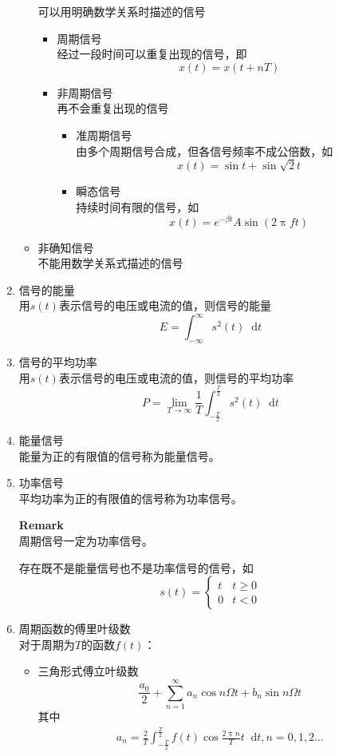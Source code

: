 \documentclass[UTF8]{ctexrep}
\newcommand{\dif}{\mathop{}\!{}\mathrm{d}}
\def\pth#1{\left( {#1}\right)}
\renewcommand{\rem}{{\bfseries Remark}}
\begin{document}
\begin{enumerate}
\begin{itemize}
可以用明确数学关系时描述的信号
\begin{itemize}
\item 周期信号\\
经过一段时间可以重复出现的信号，即
\[x(t)=x(t+nT)\]
\item 非周期信号\\
再不会重复出现的信号
\begin{itemize}
\item 准周期信号\\
由多个周期信号合成，但各信号频率不成公倍数，如
\[x(t)=\sin t+\sin\sqrt{2}t\]
\item 瞬态信号\\
持续时间有限的信号，如
\[x(t)=e^{-\beta t}A\sin\pth{2\uppi ft}\]
\end{itemize}
\end{itemize}
\item 非确知信号\\
不能用数学关系式描述的信号
\end{itemize}
\item 信号的能量\\
用$s(t)$表示信号的电压或电流的值，则信号的能量
\[
E=\int_{-\infty}^{\infty}s^2(t)\dif t
\]
\item 信号的平均功率\\
用$s(t)$表示信号的电压或电流的值，则信号的平均功率
\[
P=\lim_{T\to\infty}\frac{1}{T}\int_{-\frac{T}{2}}^{\frac{T}{2}}s^2(t)\dif t
\]
\item 能量信号\\
能量为正的有限值的信号称为能量信号。
\item 功率信号\\
平均功率为正的有限值的信号称为功率信号。\par
\rem\\
周期信号一定为功率信号。\par
存在既不是能量信号也不是功率信号的信号，如
\[
s(t)=\begin{cases}t&t\geq 0\\0&t<0\end{cases}
\]
\item 周期函数的傅里叶级数\\
对于周期为$T$的函数$f(t)$：
\begin{itemize}
\item 三角形式傅立叶级数
\[
\frac{a_0}{2}+\sum_{n=1}^{\infty}a_n\cos n\Omega t+b_n\sin n\Omega t
\]
其中
\begin{gather*}
a_n=\frac{2}{T}\int_{-\frac{T}{2}}^{\frac{T}{2}}f(t)\cos\frac{2\uppi n}{T}t\dif t, n=0, 1, 2\ldots \\

\end{gather*}
\end{itemize}
\end{enumerate}
\end{document}
